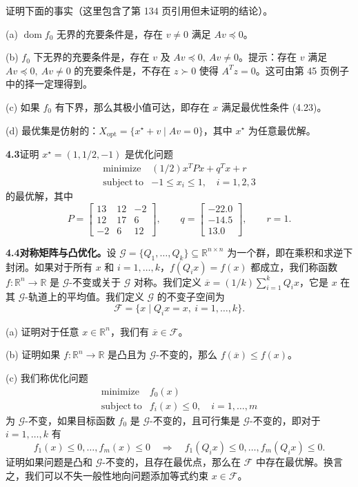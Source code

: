 \documentclass[UTF8,12pt,a4paper,fontset=fandol]{ctexart}
\begin{document}
证明下面的事实（这里包含了第 134 页引用但未证明的结论）。

(a) $\operatorname{dom} f_0$ 无界的充要条件是，存在 $v\neq0$ 满足 $Av\preceq0$。

(b) $f_0$ 下无界的充要条件是，存在 $v$ 及 $Av\preceq0,\ Av\neq0$。提示：存在 $v$ 满足 $Av\preceq0,\ Av\neq0$ 的充要条件是，不存在 $z\succ0$ 使得 $A^Tz=0$。这可由第 45 页例子中的择一定理得到。

(c) 如果 $f_0$ 有下界，那么其极小值可达，即存在 $x$ 满足最优性条件 (4.23)。

(d) 最优集是仿射的：$X_{\mathrm{opt}}=\{x^\star+v\mid Av=0\}$，其中 $x^\star$ 为任意最优解。

\noindent\textbf{4.3}\quad 证明 $x^\star=(1,1/2,-1)$ 是优化问题
\[
\begin{array}{ll}
\mathop{\mathrm{minimize}} & (1/2)x^TPx+q^Tx+r\\
\mathrm{subject\ to} & -1\leq x_i\leq1,\quad i=1,2,3
\end{array}
\]
的最优解，其中
\[
P=\begin{bmatrix}
13 & 12 & -2\\
12 & 17 & 6\\
-2 & 6 & 12
\end{bmatrix},
\qquad
q=\begin{bmatrix}
-22.0\\
-14.5\\
13.0
\end{bmatrix},
\qquad
r=1.
\]

\noindent\textbf{4.4\quad [P. Parrilo] 对称矩阵与凸优化。}\quad 设 $\mathcal{G}=\{Q_1,\ldots,Q_k\}\subseteq\mathbb{R}^{n\times n}$ 为一个群，即在乘积和求逆下封闭。如果对于所有 $x$ 和 $i=1,\ldots,k$，$f(Q_ix)=f(x)$ 都成立，我们称函数 $f:\mathbb{R}^n\to\mathbb{R}$ 是 $\mathcal{G}$-不变或关于 $\mathcal{G}$ 对称。我们定义 $\overline{x}=(1/k)\sum_{i=1}^k Q_ix$，它是 $x$ 在其 $\mathcal{G}$-轨道上的平均值。我们定义 $\mathcal{G}$ 的不变子空间为
\[
\mathcal{F}=\{x\mid Q_ix=x,\ i=1,\ldots,k\}.
\]

(a) 证明对于任意 $x\in\mathbb{R}^n$，我们有 $\overline{x}\in\mathcal{F}$。

(b) 证明如果 $f:\mathbb{R}^n\to\mathbb{R}$ 是凸且为 $\mathcal{G}$-不变的，那么 $f(\overline{x})\leq f(x)$。

(c) 我们称优化问题
\[
\begin{array}{ll}
\mathop{\mathrm{minimize}} & f_0(x)\\
\mathrm{subject\ to} & f_i(x)\leq0,\quad i=1,\ldots,m
\end{array}
\]
为 $\mathcal{G}$-不变，如果目标函数 $f_0$ 是 $\mathcal{G}$-不变的，且可行集是 $\mathcal{G}$-不变的，即对于 $i=1,\ldots,k$ 有
\[
f_1(x)\leq0,\ldots,f_m(x)\leq0
\quad\Longrightarrow\quad
f_1(Q_ix)\leq0,\ldots,f_m(Q_ix)\leq0.
\]
证明如果问题是凸和 $\mathcal{G}$-不变的，且存在最优点，那么在 $\mathcal{F}$ 中存在最优解。换言之，我们可以不失一般性地向问题添加等式约束 $x\in\mathcal{F}$。
\end{document}
